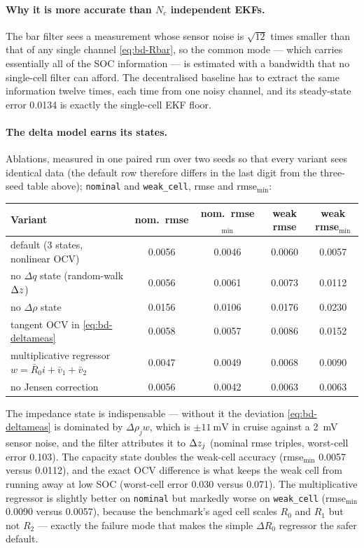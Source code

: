 \paragraph{Why it is more accurate than $N_c$ independent EKFs.} The bar filter sees a
measurement whose sensor noise is $\sqrt{12}$ times smaller than that of any single channel
\eqref{eq:bd-Rbar}, so the common mode --- which carries essentially all of the SOC information
--- is estimated with a bandwidth that no single-cell filter can afford. The decentralised
baseline has to extract the same information twelve times, each time from one noisy channel, and
its steady-state error \num{0.0134} is exactly the single-cell EKF floor.

\paragraph{The delta model earns its states.} Ablations, measured in one paired run over two
seeds so that every variant sees identical data (the default row therefore differs in the last
digit from the three-seed table above); \texttt{nominal} and \texttt{weak\_cell}, rmse and
rmse$_{\min}$:
\begin{center}\small
\begin{tabular}{@{}lcccc@{}}
\toprule
Variant & nom.\ rmse & nom.\ rmse$_{\min}$ & weak rmse & weak rmse$_{\min}$ \\
\midrule
default (3 states, nonlinear OCV)      & 0.0056 & 0.0046 & 0.0060 & 0.0057 \\
no $\Delta q$ state (random-walk $\Delta z$)    & 0.0056 & 0.0061 & 0.0073 & 0.0112 \\
no $\Delta\rho$ state                  & 0.0156 & 0.0106 & 0.0176 & 0.0230 \\
tangent OCV in \eqref{eq:bd-deltameas} & 0.0058 & 0.0057 & 0.0086 & 0.0152 \\
multiplicative regressor $w=\bar R_0 i+\bar v_1+\bar v_2$ & 0.0047 & 0.0049 & 0.0068 & 0.0090 \\
no Jensen correction                   & 0.0056 & 0.0042 & 0.0063 & 0.0063 \\
\bottomrule
\end{tabular}
\end{center}
The impedance state is indispensable --- without it the deviation
\eqref{eq:bd-deltameas} is dominated by $\Delta\rho_j w$, which is $\pm\SI{11}{\milli\volt}$ in
cruise against a \SI{2}{\milli\volt} sensor noise, and the filter attributes it to
$\Delta z_j$ (nominal rmse triples, worst-cell error \num{0.103}). The capacity state doubles
the weak-cell accuracy (rmse$_{\min}$ \num{0.0057} versus \num{0.0112}), and the exact OCV
difference is what keeps the weak cell from running away at low SOC (worst-cell error \num{0.030}
versus \num{0.071}). The multiplicative regressor is slightly better on \texttt{nominal} but
markedly worse on \texttt{weak\_cell} (rmse$_{\min}$ \num{0.0090} versus \num{0.0057}), because
the benchmark's aged cell scales $R_0$ and $R_1$ but not $R_2$ --- exactly the failure mode that
makes the simple $\Delta R_0$ regressor the safer default.

